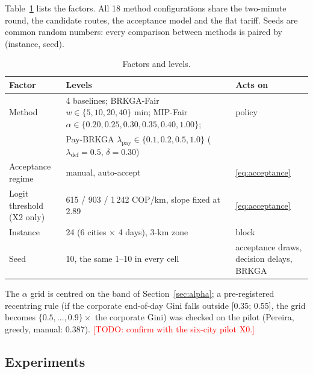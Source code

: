 \documentclass[preprint,12pt,authoryear]{elsarticle}%
\newcommand{\todo}[1]{\textcolor{red}{[TODO: #1]}}
\begin{document}
Table~\ref{tab:factors} lists the factors. All 18 method configurations share the two-minute round, the candidate routes, the acceptance model and the flat tariff. Seeds are common random numbers: every comparison between methods is paired by (instance, seed).

\begin{table}[ht]
\centering\small
\caption{Factors and levels.}
\label{tab:factors}
\begin{tabular}{lll}
\toprule
Factor & Levels & Acts on \\
\midrule
Method & 4 baselines; BRKGA-Fair $w \in \{5, 10, 20, 40\}$ min; MIP-Fair $\alpha \in \{0.20, 0.25, 0.30, 0.35, 0.40, 1.00\}$; & policy \\
 & Pay-BRKGA $\lambda_{\text{pay}} \in \{0.1, 0.2, 0.5, 1.0\}$ ($\lambda_{\text{def}} = 0.5$, $\delta = 0.30$) & \\
Acceptance regime & manual, auto-accept & \eqref{eq:acceptance} \\
Logit threshold (X2 only) & 615 / 903 / 1\,242 COP/km, slope fixed at 2.89 & \eqref{eq:acceptance} \\
Instance & 24 (6 cities $\times$ 4 days), 3-km zone & block \\
Seed & 10, the same 1--10 in every cell & acceptance draws, decision delays, BRKGA \\
\bottomrule
\end{tabular}
\end{table}

The $\alpha$ grid is centred on the band of Section~\ref{sec:alpha}; a pre-registered recentring rule (if the corporate end-of-day Gini falls outside [0.35; 0.55], the grid becomes $\{0.5, \dots, 0.9\} \times$ the corporate Gini) was checked on the pilot (Pereira, greedy, manual: 0.387). \todo{confirm with the six-city pilot X0.}

\subsection{Experiments}
\end{document}
